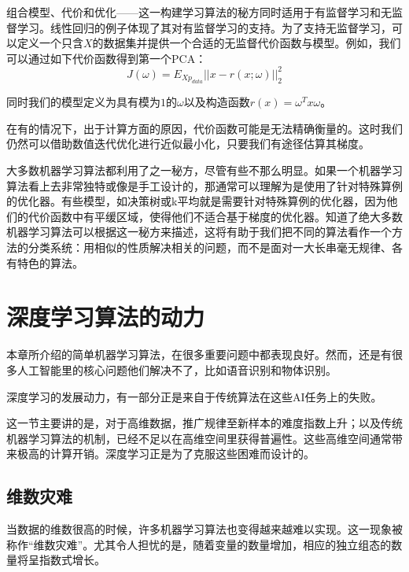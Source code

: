 组合模型、代价和优化——这一构建学习算法的秘方同时适用于有监督学习和无监督学习。线性回归的例子体现了其对有监督学习的支持。为了支持无监督学习，可以定义一个只含$X$的数据集并提供一个合适的无监督代价函数与模型。例如，我们可以通过如下代价函数得到第一个PCA：
\begin{equation}
	J(\omega) = E_{X p_{data}}||x - r(x;\omega)||_2^2
	\label{form:5.94}
\end{equation}

同时我们的模型定义为具有模为$1$的$\omega$以及构造函数$r(x)=\omega^Tx\omega$。

在有的情况下，出于计算方面的原因，代价函数可能是无法精确衡量的。这时我们仍然可以借助数值迭代优化进行近似最小化，只要我们有途径估算其梯度。

大多数机器学习算法都利用了之一秘方，尽管有些不那么明显。如果一个机器学习算法看上去非常独特或像是手工设计的，那通常可以理解为是使用了针对特殊算例的优化器。有些模型，如决策树或k平均就是需要针对特殊算例的优化器，因为他们的代价函数中有平缓区域，使得他们不适合基于梯度的优化器。知道了绝大多数机器学习算法可以根据这一秘方来描述，这将有助于我们把不同的算法看作一个方法的分类系统：用相似的性质解决相关的问题，而不是面对一大长串毫无规律、各有特色的算法。


\section{深度学习算法的动力}
\label{sec:5.11}

本章所介绍的简单机器学习算法，在很多重要问题中都表现良好。然而，还是有很多人工智能里的核心问题他们解决不了，比如语音识别和物体识别。

深度学习的发展动力，有一部分正是来自于传统算法在这些AI任务上的失败。

这一节主要讲的是，对于高维数据，推广规律至新样本的难度指数上升；以及传统机器学习算法的机制，已经不足以在高维空间里获得普遍性。这些高维空间通常带来极高的计算开销。深度学习正是为了克服这些困难而设计的。


\subsection{维数灾难}
\label{sec:5.11.1}

当数据的维数很高的时候，许多机器学习算法也变得越来越难以实现。这一现象被称作“维数灾难”。尤其令人担忧的是，随着变量的数量增加，相应的独立组态的数量将呈指数式增长。

